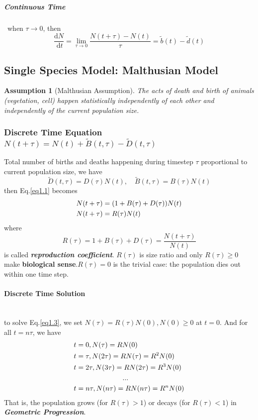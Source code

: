 \documentclass[12pt, a4paper, oneside]{article}
\newtheorem{assumption}{Assumption}[section]
\newcommand{\myref}[1]{Eq.\ref{#1}}
\begin{document}
\subparagraph{Continuous Time}~{when $\tau \rightarrow 0$, then
\begin{equation}
    \frac{\mathrm{d} N}{\mathrm{~d} t}=\lim _{\tau \rightarrow 0} \frac{N(t+\tau)-N(t)}{\tau}=\tilde{b}(t)-\tilde{d}(t)\label{eq1.2}
\end{equation}
}

\newpage
\subsection{Single Species Model: Malthusian Model}
\begin{assumption}[Malthusian Assumption]
    The acts of death and birth of animals (vegetation, cell) happen statistically independently of each other and independently of the current population size.
\end{assumption}


\subsubsection{Discrete Time Equation $N(t+\tau)=N(t)+\tilde{B}(t, \tau)-\tilde{D}(t, \tau)$}
Total number of births and deaths happening during timestep $\tau$ proportional to current population size, we have
$$
    \tilde{D}(t, \tau)=D(\tau) N(t), \quad \tilde{B}(t, \tau)=B(\tau) N(t)
$$
then \myref{eq1.1} becomes
\begin{align}
    N(t+\tau) & =(1+B(\tau)+D(\tau))N(t)\notag \\
    N(t+\tau) & =R(\tau)N(t)\label{eq1.3}
\end{align}
where
$$
    R(\tau) = 1+B(\tau)+D(\tau) = \frac{N(t+\tau)}{N(t)}
$$
is called \textbf{\emph{reproduction coefficient}}. $R(\tau)$ is size ratio and only $R(\tau)\geq 0$ make \textbf{biological sense}.$R(\tau) = 0$ is the trivial case: the population dies out within one time step.

\paragraph{Discrete Time Solution}~{}\\
to solve \myref{eq1.3}, we set $N(\tau)=R(\tau)N(0), N(0)\geq 0$ at $t=0$. And for all $t=n\tau$, we have
\begin{align}
     & t=0,N(\tau)=RN(0)\notag                              \\
     & t=\tau, N(2\tau)=R N(\tau)=R^{2} N(0)\notag          \\
     & t=2 \tau, N(3 \tau)=R N(2 \tau)=R^{3} N(0)\notag     \\
     & \qquad \qquad \qquad \quad...\notag                  \\
     & t=n \tau, N(n\tau)=RN(n\tau)=R^{n} N(0)\label{eq1.4}
\end{align}
That is, the population grows (for $R(\tau) > 1$) or decays (for $R(\tau) < 1$) in \emph{\textbf{Geometric Progression}}.
\end{document}
